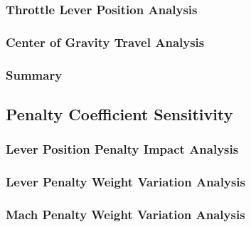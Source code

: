 \documentclass[12pt, a4paper]{report}
\begin{document}
\subsubsection{Throttle Lever Position Analysis}



\subsubsection{Center of Gravity Travel Analysis}


\subsubsection{Summary}





\subsection{Penalty Coefficient Sensitivity}



\subsubsection{Lever Position Penalty Impact Analysis}



\subsubsection{Lever Penalty Weight Variation Analysis}




\subsubsection{Mach Penalty Weight Variation Analysis}

\end{document}
